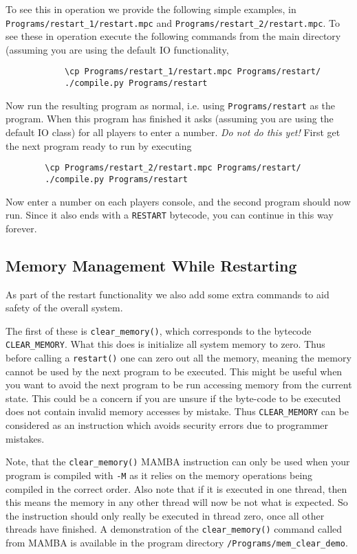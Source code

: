 To see this in operation we provide the following simple
examples, in \verb+Programs/restart_1/restart.mpc+
and \verb+Programs/restart_2/restart.mpc+.
To see these in operation execute the following commands
from the main directory (assuming you are using the
default IO functionality,
\begin{verbatim}
            \cp Programs/restart_1/restart.mpc Programs/restart/
            ./compile.py Programs/restart
\end{verbatim}
Now run the resulting program as normal, i.e. using \verb+Programs/restart+
as the program.
When this program has finished it asks (assuming you are
using the default IO class) for all players to enter
a number. {\em Do not do this yet!}
First get the next program ready to run by executing
\begin{verbatim}
        \cp Programs/restart_2/restart.mpc Programs/restart/
        ./compile.py Programs/restart
\end{verbatim}
Now enter a number on each players console, and 
the second program should now run.
Since it also ends with a \verb+RESTART+ bytecode, you can
continue in this way forever.

\subsection{Memory Management While Restarting}
As part of the restart functionality we also add some extra commands to aid
safety of the overall system.

The first of these is \verb+clear_memory()+, which corresponds to the bytecode
\verb+CLEAR_MEMORY+.
What this does is initialize all system memory to zero. Thus before calling a 
\verb+restart()+ one can zero out all the memory, meaning the memory cannot be
used by the next program to be executed. This might be useful when you want to
avoid the next program to be run accessing memory from the current state. This
could be a concern if you are unsure if the byte-code to be executed does not
contain invalid memory accesses by mistake. Thus \verb+CLEAR_MEMORY+ can be
considered as an instruction which avoids security errors due to programmer
mistakes.

Note, that the \verb+clear_memory()+ MAMBA instruction can only be used when your
program is compiled with \verb+-M+ as it relies on the memory operations being
compiled in the correct order.
Also note that if it is executed in one thread, then this means the memory
in any other thread will now be not what is expected. So the instruction 
should only really be executed in thread zero, once all other threads have
finished.
A demonstration of the \verb+clear_memory()+ command called from MAMBA is
available in the program directory \verb+/Programs/mem_clear_demo+.

